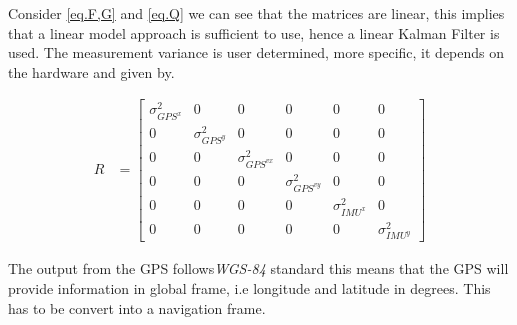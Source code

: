 Consider \eqref{eq.F,G} and \eqref{eq.Q} we can see that the matrices are linear, this implies that a linear model approach is sufficient to use, hence a linear Kalman Filter is used. The measurement variance is user determined, more specific, it depends on the hardware and given by.

\begin{align}
R&=
\begin{bmatrix}
\sigma^2_{GPS^{x}} & 0 & 0 & 0 & 0 & 0\\
0 & \sigma^2_{GPS^{y}} & 0 & 0 & 0 & 0\\
0 & 0 & \sigma^2_{GPS^{vx}} & 0 & 0 & 0\\
0 & 0 & 0 & \sigma^2_{GPS^{vy}} & 0 & 0\\
0 & 0 & 0 & 0 & \sigma^2_{{IMU}^{x}} & 0\\
0 & 0 & 0 & 0 & 0 & \sigma^2_{IMU^{y}}
\end{bmatrix}
\end{align}

The output from the GPS follows\emph{WGS-84} standard this means that the GPS will provide information in global frame, i.e longitude and latitude in degrees. This has to be convert into a navigation frame. 	
